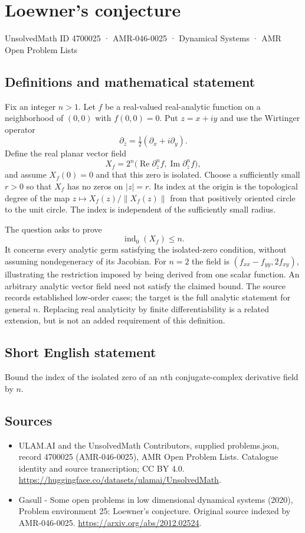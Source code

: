 \documentclass[11pt,a4paper]{article}
\begin{document}
\section*{Loewner's conjecture}\label{4700025}
{\small UnsolvedMath ID 4700025 · AMR-046-0025 · Dynamical Systems · AMR Open Problem Lists}
\subsection{Definitions and mathematical statement}
Fix an integer $n>1$. Let $f$ be a real-valued real-analytic function on
a neighborhood of $(0,0)$ with $f(0,0)=0$. Put $z=x+iy$ and use the
Wirtinger operator
\[
 \partial_{\bar z}=\tfrac12(\partial_x+i\partial_y).
\]
Define the real planar vector field
\[
 X_f=2^n\bigl(\operatorname{Re}\partial_{\bar z}^{n}f,
                 \operatorname{Im}\partial_{\bar z}^{n}f\bigr),
\]
and assume $X_f(0)=0$ and that this zero is isolated. Choose a sufficiently
small $r>0$ so that $X_f$ has no zeros on $|z|=r$. Its index at the origin
is the topological degree of the map
$z\mapsto X_f(z)/\|X_f(z)\|$ from that positively oriented circle to
the unit circle. The index is independent of the sufficiently small radius.

The question asks to prove
\[
 \operatorname{ind}_0(X_f)\le n.
\]
It concerns every analytic germ satisfying the isolated-zero condition,
without assuming nondegeneracy of its Jacobian. For $n=2$ the field is
$(f_{xx}-f_{yy},2f_{xy})$, illustrating the restriction imposed by being
derived from one scalar function. An arbitrary analytic vector field need
not satisfy the claimed bound. The source records established low-order
cases; the target is the full analytic statement for general $n$.
Replacing real analyticity by finite differentiability is a related
extension, but is not an added requirement of this definition.
\subsection{Short English statement}
Bound the index of the isolated zero of an $n$th conjugate-complex derivative field by $n$.
\subsection{Sources}
\begin{itemize}
\item[S1] ULAM.AI and the UnsolvedMath Contributors, supplied problems.json, record 4700025 (AMR-046-0025), AMR Open Problem Lists. Catalogue identity and source transcription; CC BY 4.0.
\url{https://huggingface.co/datasets/ulamai/UnsolvedMath}.
\item[S2] Gasull - Some open problems in low dimensional dynamical systems (2020), Problem environment 25: Loewner's conjecture. Original source indexed by AMR-046-0025.
\url{https://arxiv.org/abs/2012.02524}.
\end{itemize}
\end{document}
